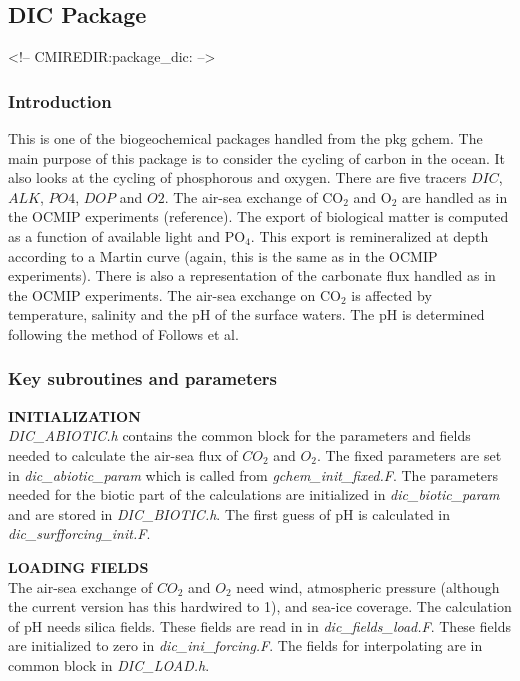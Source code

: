 \subsection {DIC Package} 
\label{sec:pkg:dic}
\begin{rawhtml}
<!-- CMIREDIR:package_dic: -->
\end{rawhtml}

\subsubsection {Introduction}
This is one of the biogeochemical packages handled from the
pkg gchem. The main purpose of this package is to consider
the cycling of carbon in the ocean. It also looks at the
cycling of phosphorous and oxygen. There are five tracers
$DIC$, $ALK$, $PO4$, $DOP$ and $O2$. The air-sea exchange
of CO$_2$ and O$_2$ are handled as in the OCMIP experiments
(reference). The export of biological matter is computed
as a function of available light and PO$_4$. This export is
remineralized at depth according to a Martin curve (again,
this is the same as in the OCMIP experiments). There is
also a representation of the carbonate flux handled as in
the OCMIP experiments. The air-sea exchange on CO$_2$
is affected by temperature, salinity and the pH of the
surface waters. The pH is determined following the
method of Follows et al. 

\subsubsection {Key subroutines and parameters}

\noindent
{{\bf INITIALIZATION}} \\
{\it DIC\_ABIOTIC.h} contains the common block for the 
parameters and fields needed to calculate the air-sea
flux of $CO_2$ and $O_2$. The fixed parameters are set in
{\it dic\_abiotic\_param} which is called from {\it gchem\_init\_fixed.F}.
The parameters needed for the biotic part of the calculations
are initialized in {\it dic\_biotic\_param} and are stored
in {\it DIC\_BIOTIC.h}. The first guess of pH is calculated
in {\it dic\_surfforcing\_init.F}.

\vspace{.5cm}

\noindent
{{\bf LOADING FIELDS}}\\
The air-sea exchange of $CO_2$ and $O_2$ need wind, atmospheric
pressure (although the current version has this hardwired to 1),
and sea-ice coverage. The calculation of pH needs silica fields.
These fields are read in in {\it dic\_fields\_load.F}. These
fields are initialized to zero in {\it dic\_ini\_forcing.F}.
The fields for interpolating are in common block in 
{\it DIC\_LOAD.h}.

